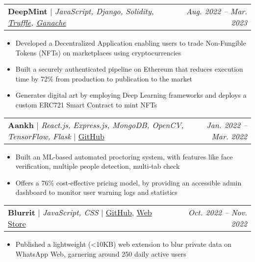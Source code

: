 \documentclass[letterpaper,10pt]{article}
\makeatletter
\newcommand{\resumeItem}[1]{
  \item\small{
    {#1 \vspace{-2pt}}
  }
}
\newcommand{\resumeProjectHeading}[2]{
    \item
    \begin{tabular*}{0.97\textwidth}{l@{\extracolsep{\fill}}r}
      #1 & \small\textit{#2} \\
    \end{tabular*}\vspace{-6pt}
}
\newcommand{\resumeItemListStart}{\begin{itemize}}
\newcommand{\resumeItemListEnd}{\end{itemize}\vspace{-5pt}}
\makeatother
\begin{document}
      \resumeProjectHeading {
            \textbf{DeepMint} 
            $|$ 
            \small
            {
                \emph{JavaScript, Django, Solidity, \href{https://trufflesuite.com}{Truffle}, \href{https://trufflesuite.com/ganache}{Ganache}}
            }
        }
        {Aug. 2022 -- Mar. 2023}
        \resumeItemListStart
            \resumeItem {
                Developed a Decentralized Application enabling users to trade Non-Fungible Tokens (NFTs) on marketplaces using cryptocurrencies 
            }
            \resumeItem {
                Built a securely authenticated pipeline on Ethereum that reduces execution time by 72\% from production to publication to the market
            }
            \resumeItem{
                Generates digital art by employing Deep Learning frameworks and deploys a custom ERC721 Smart Contract to mint NFTs
            }
        \resumeItemListEnd

        \resumeProjectHeading { 
            \textbf{Aankh} 
            $|$ 
            \small
            {
                \emph{React.js, Express.js, MongoDB, OpenCV, TensorFlow, Flask}
            }
            $|$ 
            \href{https://github.com/tusharnankani/Aankh}{GitHub}        
        }
        {Jan. 2022 -- Mar. 2022}
        \resumeItemListStart
            \resumeItem {
                Built an ML-based automated proctoring system, with features like face verification, multiple people detection, multi-tab check
            }
            \resumeItem {
                Offers a 76\% cost-effective pricing model, by providing an accessible admin dashboard to monitor user warning logs and statistics
            }
        \resumeItemListEnd

        \resumeProjectHeading { 
            \textbf{Blurrit} 
            $|$ 
            \small {   
                \emph{JavaScript, CSS}
            }
            $|$ 
            \href{https://github.com/tusharnankani/blurrit}{GitHub}, \href{https://chromewebstore.google.com/detail/blurrit/idknnkkejgomjlgbdpoblkfhhicekdjl}{Web Store}
        }
        {Oct. 2022 -- Nov. 2022}
        \resumeItemListStart
            \resumeItem {
                 Published a lightweight (<10KB) web extension to blur private data on WhatsApp Web, garnering around 250 daily active users
            }
        \resumeItemListEnd
\end{document}

